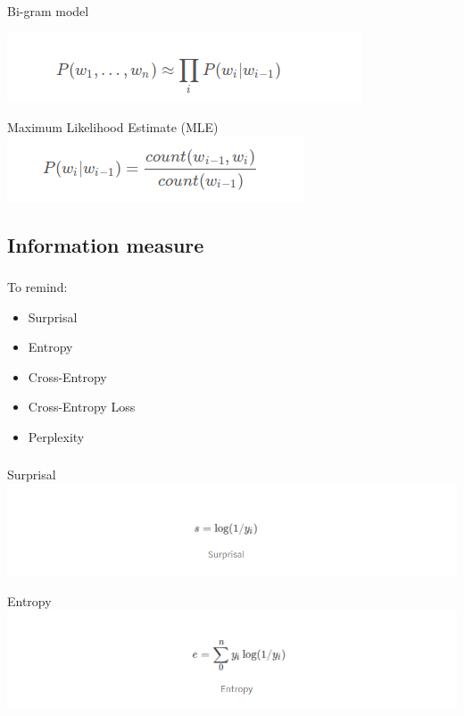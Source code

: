 \documentclass[t, 11pt]{beamer}
\begin{document}
\begin{frame}
	\frametitle{\insertsection}
	\frametitle{\insertsubsection}
	
	Bi-gram model
	
	\vspace{1cm}
	\includegraphics[width=0.6\linewidth]{2.png}
	
	\vspace{1cm}
	
	Maximum Likelihood Estimate (MLE)
	\includegraphics[width=0.6\linewidth]{mle.png}
	
\end{frame}

\subsection{Information measure}

\begin{frame} \label{l3}
	\frametitle{\insertsection}
	\frametitle{\insertsubsection}
To remind:	
\begin{itemize}
	\item Surprisal
	\item Entropy
	\item Cross-Entropy
	\item Cross-Entropy Loss
	\item Perplexity
\end{itemize}
\end{frame}

\begin{frame}
	\frametitle{\insertsection}
	\frametitle{\insertsubsection}
	Surprisal
	\includegraphics[width=1\linewidth]{surp.png}	
	
	\vspace{0.5cm}
	Entropy
\includegraphics[width=1\linewidth]{entropy.png}
\end{frame}
\end{document}
